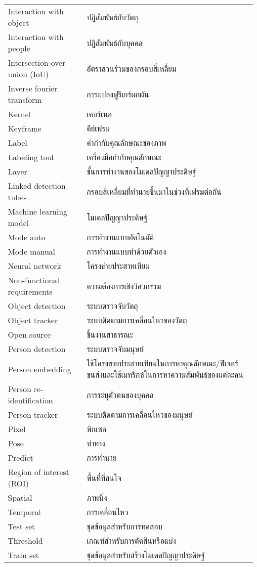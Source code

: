 \begin{abbreviations}
    \noindent
    \begin{tabular*}{\textwidth}{@{}p{}p{}@{}}
	Interaction with object  &  ปฏิสัมพันธ์กับวัตถุ\\
        Interaction with people & ปฏิสัมพันธ์กับบุคคล\\
	Intersection over union (IoU) & อัตราส่วนร่วมของกรอบสี่เหลี่ยม\\
	Inverse fourier transform & การแปลงฟูรีเยร์ผกผัน\\
	Kernel & เคอร์เนล\\
	Keyframe & คีย์เฟรม\\
	Label & คำกำกับคุณลักษณะของภาพ\\
	Labeling tool & เครื่องมือกำกับคุณลักษณะ\\
	Layer & ชั้นการทำงานของโมเดลปัญญาประดิษฐ์\\
	Linked detection tubes & กรอบสี่เหลี่ยมที่ทำนายขึ้นมาในช่วงที่เฟรมต่อกัน\\
	Machine learning model & โมเดลปัญญาประดิษฐ์\\
	Mode auto & การทำงานแบบอัตโนมัติ\\
	Mode manual & การทำงานแบบทำด้วยตัวเอง\\
	Neural network & โครงข่ายประสาทเทียม\\
	Non-functional requirements & ความต้องการเชิงวิศวกรรม\\
	Object detection & ระบบตรวจจับวัตถุ\\
	Object tracker & ระบบติดตามการเคลื่อนไหวของวัตถุ\\
	Open source & ชิ้นงานสาธารณะ\\
	Person detection & ระบบตรวจจับมนุษย์\\
	Person embedding & ใช้โครงขายประสาทเทียมในการหาคุณลักษณะ/ฟีเจอร์ขนส่งและใช้เมทริกซ์ในการหาความสัมพันธ์ของแต่ละคน\\
	Person re-identification & การระบุตัวตนของบุคคล\\
	Person tracker & ระบบติดตามการเคลื่อนไหวของมนุษย์\\
	Pixel & พิกเซล\\
	Pose & ท่าทาง\\
	Predict & การทำนาย\\
	Region of interest (ROI) & พื้นที่ที่สนใจ\\
	Spatial & ภาพนิ่ง\\
	Temporal & การเคลื่อนไหว\\
	Test set & ชุดข้อมูลสำหรับการทดสอบ\\
        Threshold & เกณฑ์สำหรับการตัดสินหรือแบ่ง\\
	Train set & ชุดข้อมูลสำหรับสร้างโมเดลปัญญาประดิษฐ์\\
    \end{tabular*}
\end{abbreviations}


